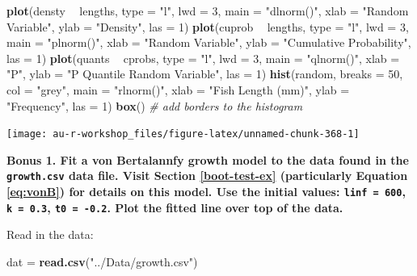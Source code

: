 \documentclass[]{book}
\newenvironment{Shaded}{\begin{snugshade}}{\end{snugshade}}
\newcommand{\CommentTok}[1]{\textcolor[rgb]{0.56,0.35,0.01}{\textit{#1}}}
\newcommand{\DataTypeTok}[1]{\textcolor[rgb]{0.13,0.29,0.53}{#1}}
\newcommand{\DecValTok}[1]{\textcolor[rgb]{0.00,0.00,0.81}{#1}}
\newcommand{\KeywordTok}[1]{\textcolor[rgb]{0.13,0.29,0.53}{\textbf{#1}}}
\newcommand{\NormalTok}[1]{#1}
\newcommand{\OperatorTok}[1]{\textcolor[rgb]{0.81,0.36,0.00}{\textbf{#1}}}
\newcommand{\StringTok}[1]{\textcolor[rgb]{0.31,0.60,0.02}{#1}}
\begin{document}
\begin{Shaded}
\begin{Highlighting}[]
\KeywordTok{plot}\NormalTok{(densty }\OperatorTok{~}\StringTok{ }\NormalTok{lengths, }\DataTypeTok{type =} \StringTok{"l"}\NormalTok{, }\DataTypeTok{lwd =} \DecValTok{3}\NormalTok{, }\DataTypeTok{main =} \StringTok{"dlnorm()"}\NormalTok{,}
     \DataTypeTok{xlab =} \StringTok{"Random Variable"}\NormalTok{, }\DataTypeTok{ylab =} \StringTok{"Density"}\NormalTok{, }\DataTypeTok{las =} \DecValTok{1}\NormalTok{)}
\KeywordTok{plot}\NormalTok{(cuprob }\OperatorTok{~}\StringTok{ }\NormalTok{lengths, }\DataTypeTok{type =} \StringTok{"l"}\NormalTok{, }\DataTypeTok{lwd =} \DecValTok{3}\NormalTok{, }\DataTypeTok{main =} \StringTok{"plnorm()"}\NormalTok{,}
     \DataTypeTok{xlab =} \StringTok{"Random Variable"}\NormalTok{, }\DataTypeTok{ylab =} \StringTok{"Cumulative Probability"}\NormalTok{, }\DataTypeTok{las =} \DecValTok{1}\NormalTok{)}
\KeywordTok{plot}\NormalTok{(quants }\OperatorTok{~}\StringTok{ }\NormalTok{cprobs, }\DataTypeTok{type =} \StringTok{"l"}\NormalTok{, }\DataTypeTok{lwd =} \DecValTok{3}\NormalTok{, }\DataTypeTok{main =} \StringTok{"qlnorm()"}\NormalTok{,}
     \DataTypeTok{xlab =} \StringTok{"P"}\NormalTok{, }\DataTypeTok{ylab =} \StringTok{"P Quantile Random Variable"}\NormalTok{, }\DataTypeTok{las =} \DecValTok{1}\NormalTok{)}
\KeywordTok{hist}\NormalTok{(random, }\DataTypeTok{breaks =} \DecValTok{50}\NormalTok{, }\DataTypeTok{col =} \StringTok{"grey"}\NormalTok{, }\DataTypeTok{main =} \StringTok{"rlnorm()"}\NormalTok{,}
     \DataTypeTok{xlab =} \StringTok{"Fish Length (mm)"}\NormalTok{, }\DataTypeTok{ylab =} \StringTok{"Frequency"}\NormalTok{, }\DataTypeTok{las =} \DecValTok{1}\NormalTok{)}
\KeywordTok{box}\NormalTok{() }\CommentTok{# add borders to the histogram}
\end{Highlighting}
\end{Shaded}

\begin{center}\texttt{[image: au-r-workshop\_files/figure-latex/unnamed-chunk-368-1]} \end{center}

\textbf{Bonus 1. Fit a von Bertalannfy growth model to the data found in the \texttt{growth.csv} data file. Visit Section \ref{boot-test-ex} (particularly Equation \eqref{eq:vonB}) for details on this model. Use the initial values: \texttt{linf\ =\ 600}, \texttt{k\ =\ 0.3}, \texttt{t0\ =\ -0.2}. Plot the fitted line over top of the data.}

Read in the data:

\begin{Shaded}
\begin{Highlighting}[]
\NormalTok{dat =}\StringTok{ }\KeywordTok{read.csv}\NormalTok{(}\StringTok{"../Data/growth.csv"}\NormalTok{)}
\end{Highlighting}
\end{Shaded}
\end{document}
